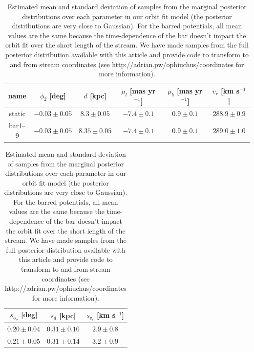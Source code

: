 \documentclass[numberedappendix]{emulateapj}
\begin{document}
\begin{table}[ht]
\footnotesize
\begin{center}
	\begin{tabular}{cccccc}
	\toprule
	name & $\phi_2$ [deg] & $d$ [kpc] & $\mu_l$ [mas yr$^{-1}$] & $\mu_b$ [mas yr$^{-1}$] & $v_r$ [km s$^{-1}$]\\\midrule
	static & $-0.03\pm0.05$ & $8.3\pm0.05$ & $-7.4\pm0.1$ & $0.9\pm0.1$ & $288.9\pm0.9$\\
	bar1--9 & $-0.03\pm0.05$ & $8.35\pm0.05$ & $-7.4\pm0.1$ & $0.9\pm0.1$ & $289.0\pm1.0$\\
	\bottomrule
	\end{tabular}
	
	\begin{tabular}{ccc}
	\toprule
	$s_{\phi_2}$ [deg] & $s_{d}$ [kpc] & $s_{v_r}$ [km s$^{-1}$]\\\midrule
	$0.20\pm0.04$ & $0.31\pm0.10$ & $2.9\pm0.8$\\
	$0.21\pm0.05$ & $0.31\pm0.14$ & $3.2\pm0.9$\\
	\bottomrule
	\end{tabular}
	\caption{Estimated mean and standard deviation of samples from the marginal posterior distributions over each parameter in our orbit fit model (the posterior distributions are very close to Gaussian). For the barred potentials, all mean values are the same because the time-dependence of the bar doesn't impact the orbit fit over the short length of the stream. We have made samples from the full posterior distribution available with this article and provide code to transform to and from stream coordinates (see http://adrian.pw/ophiuchus/coordinates for more information).\label{tbl:param-means} }
\end{center}
\end{table}
\end{document}
